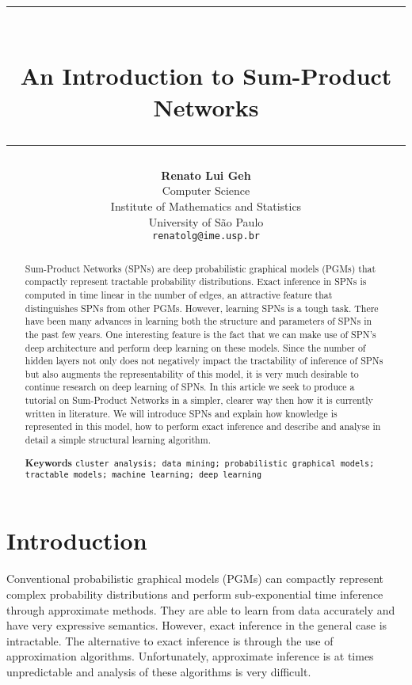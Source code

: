 \documentclass{amsart}
\title{%
  \noindent\rule{13cm}{1.0pt}\\
  \vspace{0.2cm}
  An Introduction to Sum-Product Networks
  \noindent\rule{13cm}{0.8pt}
}
\author[]{\normalsize\textbf{Renato Lui Geh}\\\small Computer Science\\Institute of Mathematics
  and Statistics\\University of São Paulo\\\texttt{renatolg@ime.usp.br}}
\theoremstyle{plain}
\numberwithin{equation}{section}
\begin{document}
\begin{abstract}
  Sum-Product Networks (SPNs) are deep probabilistic graphical models (PGMs) that compactly
  represent tractable probability distributions. Exact inference in SPNs is computed in time linear
  in the number of edges, an attractive feature that distinguishes SPNs from other PGMs. However,
  learning SPNs is a tough task. There have been many advances in learning both the structure and
  parameters of SPNs in the past few years. One interesting feature is the fact that we can make
  use of SPN's deep architecture and perform deep learning on these models. Since the number of
  hidden layers not only does not negatively impact the tractability of inference of SPNs but also
  augments the representability of this model, it is very much desirable to continue research on
  deep learning of SPNs. In this article we seek to produce a tutorial on Sum-Product Networks in
  a simpler, clearer way then how it is currently written in literature. We will introduce SPNs
  and explain how knowledge is represented in this model, how to perform exact inference and
  describe and analyse in detail a simple structural learning algorithm.

  \smallskip
  \textbf{Keywords}
  \smallskip
  \texttt{cluster analysis; data mining; probabilistic graphical
    models; tractable models; machine learning; deep learning}
  \vspace*{-3.5em}
\end{abstract}

\maketitle

\section{Introduction}

Conventional probabilistic graphical models (PGMs) can compactly represent complex probability
distributions and perform sub-exponential time inference through approximate methods. They are able
to learn from data accurately and have very expressive semantics. However, exact inference in the
general case is intractable. The alternative to exact inference is through the use of approximation
algorithms. Unfortunately, approximate inference is at times unpredictable and analysis of these
algorithms is very difficult.
\end{document}
